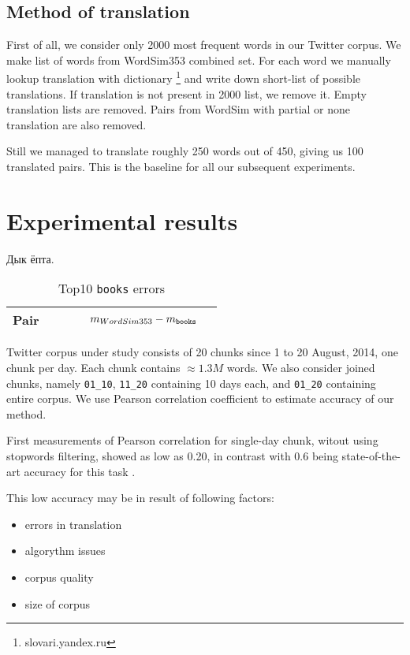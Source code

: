 \documentclass[11pt,letterpaper]{article}
\begin{document}
\subsection{Method of translation}

First of all, we consider only 2000 most frequent words in our Twitter corpus.  
We make list of words from WordSim353 combined set. For each word we manually 
lookup translation with dictionary \footnote{slovari.yandex.ru} and write down short-list 
of possible translations. If translation is not present in 2000 list, we remove it. 
Empty translation lists are removed. Pairs from WordSim with partial or none 
translation are also removed.

Still we managed to translate roughly 250 words out of 450, giving us 100 translated pairs.
This is the baseline for all our subsequent experiments. 

\section{Experimental results}

Дык ёпта.

\begin{table*}[t]
\begin{center}
\begin{tabular}{|llll|r|r|}
\hline \bf Pair & & & &   $m_{WordSim353} - m_{\tt books} $  \\ \hline

\hline
\end{tabular}
\end{center}
\caption{\label{top10-books} Top10 {\tt books} errors }
\end{table*}


Twitter corpus under study consists of 20 chunks since 1 to 20 August, 2014, one chunk per day.
Each chunk contains $\approx 1.3M$ words.
We also consider joined chunks, namely {\tt 01\_10}, {\tt 11\_20} containing 10 days each, and 
{\tt 01\_20} containing entire corpus.
We use Pearson correlation coefficient to estimate accuracy of our method.

First measurements of Pearson correlation for single-day chunk, witout using stopwords filtering, 
showed as low as 0.20, in contrast with 0.6 being state-of-the-art accuracy 
for this task \cite{mikolov2013efficient}.  


This low accuracy may be in result of following factors:

\begin{itemize}
\item errors in translation 
\item algorythm issues
\item corpus quality
\item size of corpus
\end{itemize}
\end{document}
